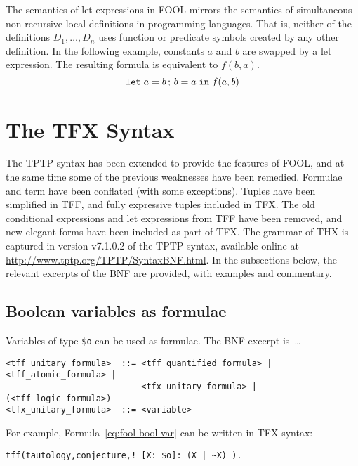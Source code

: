 \documentclass{easychair}
\begin{document}
The semantics of let expressions in FOOL mirrors the semantics of
simultaneous non-recursive local definitions in programming languages. That is,
neither of the definitions $D_1,\ldots,\allowbreak D_n$ uses function or
predicate symbols created by any other definition. In the following example,
constants $a$ and $b$ are swapped by a let expression. The resulting formula
is equivalent to $f(b, a)$.
\begin{equation}\label{eq:parallel-let-example}
\mathtt{let}\;{a}={b}\,;\,{b}={a}\;\mathtt{in}\;f(a, b)
\end{equation}

\section{The TFX Syntax}
\label{TFX}

The TPTP syntax has been extended to provide the features of FOOL,
and at the same time some of the previous weaknesses have been remedied.
Formulae and term have been conflated (with some exceptions).
Tuples have been simplified in TFF, and fully expressive tuples included in 
TFX. 
The old conditional expressions and let expressions from TFF have been 
removed, and new elegant forms have been included as part of TFX. 
The grammar of THX is captured in version v7.1.0.2 of the TPTP syntax,
available online at \url{http://www.tptp.org/TPTP/SyntaxBNF.html}.
In the subsections below, the relevant excerpts of the BNF are provided,
with examples and commentary.

\subsection{Boolean variables as formulae}

Variables of type {\tt \$o} can be used as formulae. 
The BNF excerpt is~\ldots
\begin{verbatim}
<tff_unitary_formula>  ::= <tff_quantified_formula> | <tff_atomic_formula> |
                           <tfx_unitary_formula> | (<tff_logic_formula>)
<tfx_unitary_formula>  ::= <variable>
\end{verbatim}

For example, Formula~\ref{eq:fool-bool-var} can be written in TFX syntax:
\begin{verbatim}
tff(tautology,conjecture,! [X: $o]: (X | ~X) ).
\end{verbatim}
\end{document}
